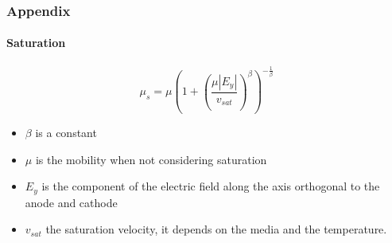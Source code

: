 \documentclass[14pt]{beamer}
\begin{document}
\begin{frame}
  \frametitle{Appendix}
  \framesubtitle{Saturation}

  \begin{equation}
		\mu_s = \mu \left (1 + \left (\frac{\mu |E_y|}{v_{sat}} \right )^{\beta} \right )^{-\frac{1}{\beta}}
		\label{eq:saturation}
	\end{equation}

\begin{itemize}
  \item $\beta$ is a constant
  \item $\mu$ is the mobility when not considering saturation
  \item $E_y$ is the component of the electric field along the axis orthogonal
  to the anode and cathode
  \item $v_{sat}$ the saturation velocity, it depends on the media and the
  temperature.
\end{itemize}

\end{frame}
\end{document}

